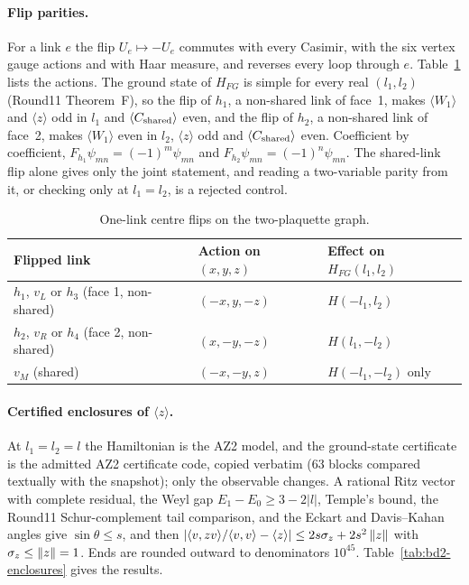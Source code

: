 \paragraph{Flip parities.} For a link $e$ the flip $U_e\mapsto-U_e$ commutes
with every Casimir, with the six vertex gauge actions and with Haar measure,
and reverses every loop through $e$. Table~\ref{tab:bd2-flips} lists the
actions. The ground state of $H_{FG}$ is simple for every real
$(l_1,l_2)$ (Round11 Theorem~F), so the flip of $h_1$, a non-shared link of
face~1, makes $\langle W_1\rangle$ and $\langle z\rangle$ odd in $l_1$ and
$\langle C_{\rm shared}\rangle$ even, and the flip of $h_2$, a non-shared link
of face~2, makes $\langle W_1\rangle$ even in $l_2$, $\langle z\rangle$ odd and
$\langle C_{\rm shared}\rangle$ even. Coefficient by coefficient,
$F_{h_1}\psi_{mn}=(-1)^m\psi_{mn}$ and $F_{h_2}\psi_{mn}=(-1)^n\psi_{mn}$. The
shared-link flip alone gives only the joint statement, and reading a
two-variable parity from it, or checking only at $l_1=l_2$, is a rejected
control.

\begin{table}[htbp]
\centering\small
\caption{One-link centre flips on the two-plaquette graph.}
\label{tab:bd2-flips}
\begin{tabular}{lll}
\toprule
Flipped link & Action on $(x,y,z)$ & Effect on $H_{FG}(l_1,l_2)$\\
\midrule
$h_1$, $v_L$ or $h_3$ (face 1, non-shared) & $(-x,y,-z)$ & $H(-l_1,l_2)$\\
$h_2$, $v_R$ or $h_4$ (face 2, non-shared) & $(x,-y,-z)$ & $H(l_1,-l_2)$\\
$v_M$ (shared) & $(-x,-y,z)$ & $H(-l_1,-l_2)$ only\\
\bottomrule
\end{tabular}
\end{table}

\paragraph{Certified enclosures of $\langle z\rangle$.} At $l_1=l_2=l$ the
Hamiltonian is the AZ2 model, and the ground-state certificate is the
admitted AZ2 certificate code, copied verbatim (63 blocks compared textually
with the snapshot); only the observable changes. A rational Ritz vector with
complete residual, the Weyl gap $E_1-E_0\ge3-2|l|$, Temple's bound, the Round11
Schur-complement tail comparison, and the Eckart and Davis--Kahan angles give
$\sin\theta\le s$, and then
$|\langle v,zv\rangle/\langle v,v\rangle-\langle z\rangle|\le2s\sigma_z+2s^2\left\lVert z\right\rVert$
with $\sigma_z\le\left\lVert z\right\rVert=1$. Ends are rounded outward to denominators
$10^{45}$. Table~\ref{tab:bd2-enclosures} gives the results.

